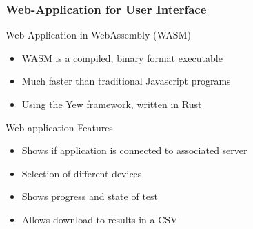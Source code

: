 \documentclass[8pt,compress,aspectratio=169]{beamer}
\begin{document}
\begin{frame}
  \frametitle{Web-Application for User Interface}
  \begin{minipage}{0.5\textwidth}
    \begin{block}{Web Application in WebAssembly (WASM)}
      \begin{itemize}
        \item WASM is a compiled, binary format executable 
        \item Much faster than traditional Javascript programs
        \item Using the Yew framework, written in Rust
      \end{itemize}
    \end{block}
    \begin{block}{Web application Features}
      \begin{itemize}
        \item Shows if application is connected to associated server
        \item Selection of different devices
        \item Shows progress and state of test
        \item Allows download to results in a CSV
      \end{itemize}
    \end{block}
  \end{minipage}
  \hfill
  \begin{minipage}{0.4\textwidth}
    \begin{figure}

\end{figure}
\end{minipage}
\end{frame}
\end{document}
